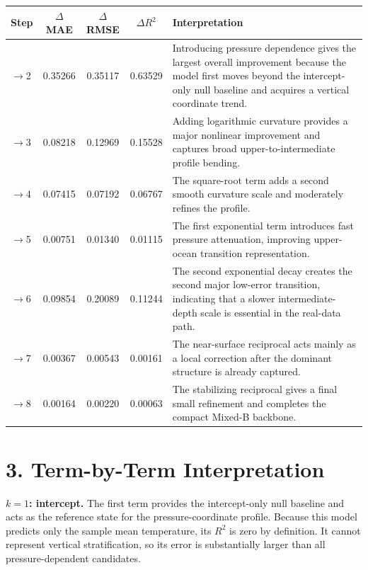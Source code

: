 \documentclass[10pt]{article}
\begin{document}
\begingroup
\small
\setlength{\tabcolsep}{5pt}
\begin{tabular}{>{\centering\arraybackslash}p{1.2cm}ccc>{\raggedright\arraybackslash}p{7.2cm}}
\toprule
Step & $\Delta$MAE & $\Delta$RMSE & $\Delta R^2$ & Interpretation \\
\midrule
1$\rightarrow$2 & 0.35266 & 0.35117 & 0.63529 & Introducing pressure dependence gives the largest overall improvement because the model first moves beyond the intercept-only null baseline and acquires a vertical coordinate trend. \\
2$\rightarrow$3 & 0.08218 & 0.12969 & 0.15528 & Adding logarithmic curvature provides a major nonlinear improvement and captures broad upper-to-intermediate profile bending. \\
3$\rightarrow$4 & 0.07415 & 0.07192 & 0.06767 & The square-root term adds a second smooth curvature scale and moderately refines the profile. \\
4$\rightarrow$5 & 0.00751 & 0.01340 & 0.01115 & The first exponential term introduces fast pressure attenuation, improving upper-ocean transition representation. \\
5$\rightarrow$6 & 0.09854 & 0.20089 & 0.11244 & The second exponential decay creates the second major low-error transition, indicating that a slower intermediate-depth scale is essential in the real-data path. \\
6$\rightarrow$7 & 0.00367 & 0.00543 & 0.00161 & The near-surface reciprocal acts mainly as a local correction after the dominant structure is already captured. \\
7$\rightarrow$8 & 0.00164 & 0.00220 & 0.00063 & The stabilizing reciprocal gives a final small refinement and completes the compact Mixed-B backbone. \\
\bottomrule
\end{tabular}
\endgroup

\section*{3. Term-by-Term Interpretation}

\noindent\textbf{$k=1$: intercept.}
The first term provides the intercept-only null baseline and acts as the reference state for the pressure-coordinate profile.
Because this model predicts only the sample mean temperature, its $R^2$ is zero by definition.
It cannot represent vertical stratification, so its error is substantially larger than all pressure-dependent candidates.
\end{document}
